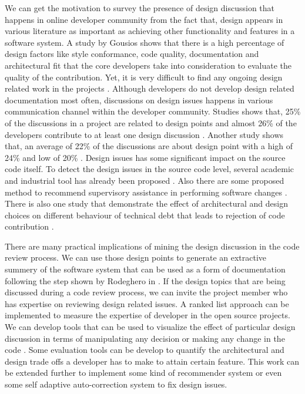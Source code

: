 We can get the motivation to survey the presence of design discussion that happens in online developer community from the fact that, design appears in various literature as important as achieving other functionality and features in a software system. A study by Gousios \cite{Gousios2015} shows that there is a high percentage of design factors like style conformance, code quality, documentation and architectural fit that the core developers take into consideration to evaluate the quality of the contribution. Yet, it is very difficult to find any ongoing design related work in the projects \cite{Brunet2014a}. Although developers do not develop design related documentation most often, discussions on design issues happens in various communication channel within the developer community. Studies shows that, 25\% of the discussions in a project are related to design points and almost 26\% of the developers contribute to at least one design discussion \cite{Brunet2014a}. Another study shows that, an average of 22\% of the discussions are about design point with a high of 24\% and low of 20\% \cite{Viviani2018}. Design issues has some significant impact on the source code itself. To detect the design issues in the source code level, several academic and industrial tool has already been proposed \cite{Sousa2018}. Also there are some proposed method to recommend supervisory assistance in performing software changes \cite{Kagdi2008}. There is also one study that demonstrate the effect of architectural and design choices on different behaviour of technical debt that leads to rejection of code contribution \cite{Curtis2012a}.

There are many practical implications of mining the design discussion in the code review process. We can use those design points to generate an extractive summery of the software system that can be used as a form of documentation following the step shown by Rodeghero in \cite{Rod2017}. If the design topics that are being discussed during a code review process, we can invite the project member who has expertise on reviewing design related issues. A ranked list approach \cite{Kagdi2008} can be implemented to measure the expertise of developer in the open source projects. We can develop tools that can be used to visualize the effect of particular design discussion in terms of manipulating any decision or making any change in the code \cite{Viviani2018a}. Some evaluation tools can be develop to quantify the architectural and design trade offs a developer has to make to attain certain feature. This work can be extended further to implement some kind of recommender system or even some self adaptive auto-correction system to fix design issues.

